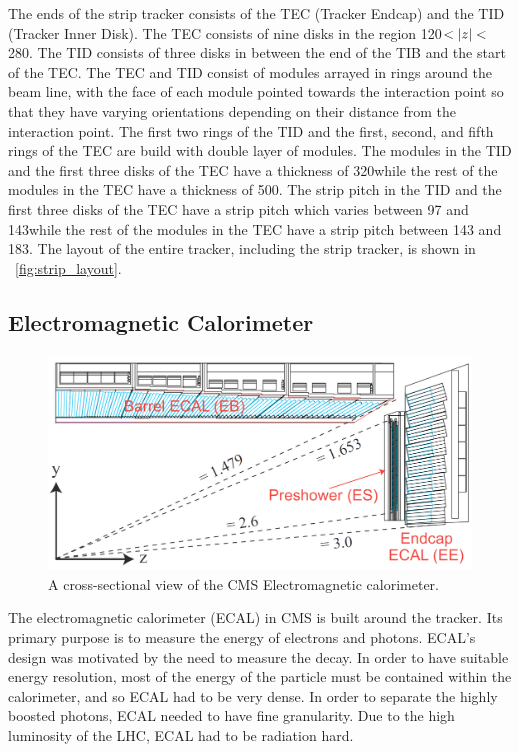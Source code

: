The ends of the strip tracker consists of the TEC (Tracker Endcap) and the TID
(Tracker Inner Disk). The TEC consists of nine disks in the region
120\centimeters $< |z| <$ 280\centimeters. The TID consists of three
disks in between the end of the TIB and the start of the TEC. The TEC and TID
consist of modules arrayed in rings around the beam line, with the face of each
module pointed towards the interaction point so that they have varying
orientations depending on their distance from the interaction point. The first
two rings of the TID and the first, second, and fifth rings of the TEC are
build with double layer of modules. The modules in the TID and the first three
disks of the TEC have a thickness of 320\micrometers while the rest of the
modules in the TEC have a thickness of 500\micrometers. The strip pitch in the
TID and the first three disks of the TEC have a strip pitch which varies
between 97 and 143\micrometers while the rest of the modules in the TEC have a
strip pitch between 143 and 183\micrometers. The layout of the entire tracker,
including the strip tracker, is shown in \FIG~\ref{fig:strip_layout}.

\subsection{Electromagnetic Calorimeter}

\begin{figure}[tb]
    \centering
    \includegraphics[width=\textwidth]{figures/ecal_layout.png}
    \caption{A cross-sectional view of the CMS Electromagnetic calorimeter.}
    \label{fig:ecal_layout}
\end{figure}

The electromagnetic calorimeter (ECAL) in CMS is built around the tracker. Its
primary purpose is to measure the energy of electrons and photons. ECAL's
design was motivated by the need to measure the \higgstogammagamma decay. In
order to have suitable energy resolution, most of the energy of the particle
must be contained within the calorimeter, and so ECAL had to be very dense. In
order to separate the highly boosted photons, ECAL needed to have fine
granularity. Due to the high luminosity of the LHC, ECAL had to be radiation
hard.

